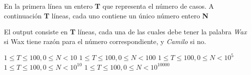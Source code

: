 \documentclass{oci}
\begin{document}
\begin{inputDescription}
En la primera línea un entero \textbf{T} que representa el número de casos.
A continuación \textbf{T} líneas, cada uno contiene un único número entero \textbf{N}
\end{inputDescription}

\begin{outputDescription}
El output consiste en \textbf{T} líneas, cada una de las cuales debe tener la palabra \textit{Wax} si Wax tiene razón para el número correspondiente, y \textit{Camilo} si no.
\end{outputDescription}

\begin{scoreDescription}
   $1 \le T \le 100, 0 \le N < 10$
   $1 \le T \le 100, 0 \le N < 100$
   $1 \le T \le 100, 0 \le N < 10^5$
   $1 \le T \le 100, 0 \le N < 10^{10}$
   $1 \le T \le 100, 0 \le N < 10^{10000}$
\end{scoreDescription}

\begin{sampleDescription}
\end{sampleDescription}
\end{document}
